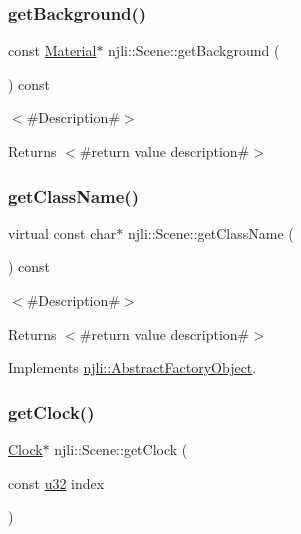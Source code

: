 \subsubsection{\texorpdfstring{get\+Background()}{getBackground()}\hspace{0.1cm}{\footnotesize\ttfamily [2/2]}}
{\footnotesize\ttfamily const \mbox{\hyperlink{classnjli_1_1_material}{Material}}$\ast$ njli\+::\+Scene\+::get\+Background (\begin{DoxyParamCaption}{ }\end{DoxyParamCaption}) const}

$<$\#\+Description\#$>$

\begin{DoxyReturn}{Returns}
$<$\#return value description\#$>$ 
\end{DoxyReturn}
\mbox{\label{classnjli_1_1_scene_acc03bc01043d647c64d512abd9fd44e3}} 
\subsubsection{\texorpdfstring{get\+Class\+Name()}{getClassName()}}
{\footnotesize\ttfamily virtual const char$\ast$ njli\+::\+Scene\+::get\+Class\+Name (\begin{DoxyParamCaption}{ }\end{DoxyParamCaption}) const\hspace{0.3cm}{\ttfamily [virtual]}}

$<$\#\+Description\#$>$

\begin{DoxyReturn}{Returns}
$<$\#return value description\#$>$ 
\end{DoxyReturn}


Implements \mbox{\hyperlink{classnjli_1_1_abstract_factory_object_af4151e41b80d5bc3fc42822c67fc2278}{njli\+::\+Abstract\+Factory\+Object}}.

\mbox{\label{classnjli_1_1_scene_a825e7bfa517703751e9263464b220911}} 
\subsubsection{\texorpdfstring{get\+Clock()}{getClock()}\hspace{0.1cm}{\footnotesize\ttfamily [1/2]}}
{\footnotesize\ttfamily \mbox{\hyperlink{classnjli_1_1_clock}{Clock}}$\ast$ njli\+::\+Scene\+::get\+Clock (\begin{DoxyParamCaption}\item[{const \mbox{\hyperlink{_util_8h_a10e94b422ef0c20dcdec20d31a1f5049}{u32}}}]{index }\end{DoxyParamCaption})}

